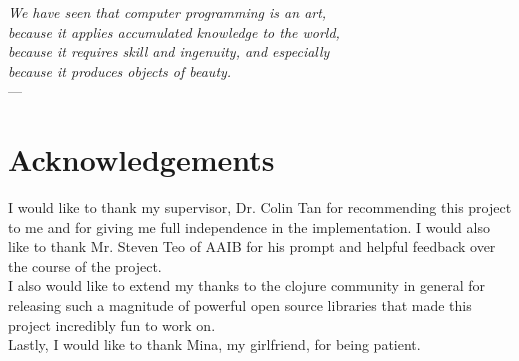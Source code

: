 

\begin{flushright}{\slshape
We have seen that computer programming is an art, \\
because it applies accumulated knowledge to the world, \\
because it requires skill and ingenuity, and especially \\
because it produces objects of beauty.} \\ \medskip
---  \citep{knuth:1974}
\end{flushright}

\bigskip


\begingroup

\let\clearpage\relax
\let\cleardoublepage\relax
\let\cleardoublepage\relax

\chapter*{Acknowledgements} %

I would like to thank my supervisor, Dr. Colin Tan for recommending this project to me and for giving me
full independence in the implementation. I would also like to thank Mr. Steven Teo of AAIB for his prompt
and helpful feedback over the course of the project. \\

I also would like to extend my thanks to the clojure community in general for releasing such a magnitude of
powerful open source libraries that made this project incredibly fun to work on.\\

Lastly, I would like to thank Mina, my girlfriend, for being patient.

\endgroup
